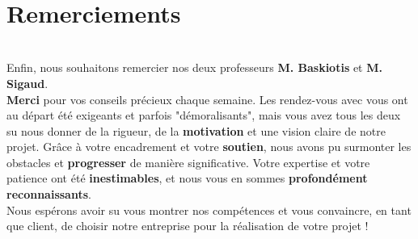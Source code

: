 \documentclass[12pt]{article}
\begin{document}
\\

\clearpage
\section*{Remerciements}
\\

Enfin, nous souhaitons remercier nos deux professeurs \textbf{M. Baskiotis} et \textbf{M. Sigaud}.\textbf{} \\

\hspace{\parindent}\textbf{Merci} pour vos conseils précieux chaque semaine. Les rendez-vous avec vous ont au départ été exigeants et parfois "démoralisants", mais vous avez tous les deux su nous donner de la rigueur, de la \textbf{motivation} et une vision claire de notre projet. Grâce à votre encadrement et votre \textbf{soutien}, nous avons pu surmonter les obstacles et \textbf{progresser} de manière significative. Votre expertise et votre patience ont été \textbf{inestimables}, et nous vous en sommes \textbf{profondément reconnaissants}. 
\\
Nous espérons avoir su vous montrer nos compétences et vous convaincre, en tant que client, de choisir notre entreprise pour la réalisation de votre projet !

\\
\end{document}
